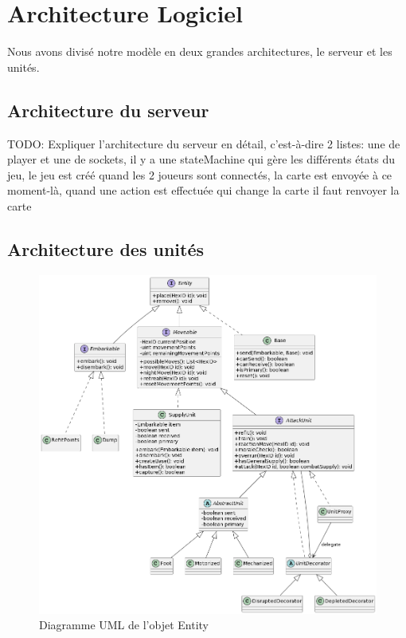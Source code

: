 
\section{Architecture Logiciel}

Nous avons divisé notre modèle en deux grandes architectures, le serveur et les unités.

\subsection{Architecture du serveur}

TODO: Expliquer l'architecture du serveur en détail, c'est-à-dire 2 listes: une de player et une de sockets, il y a une stateMachine qui gère les différents états du jeu,
le jeu est créé quand les 2 joueurs sont connectés, la carte est envoyée à  ce moment-là, quand une action est effectuée qui change la carte il faut renvoyer la carte

\subsection{Architecture des unités}

\begin{figure}[H]
    \centering
    \includegraphics[scale=0.3]{data/uml_entityV4.png}
    \caption{Diagramme UML de l'objet Entity}
    \label{fig:uml_entity}
\end{figure}

